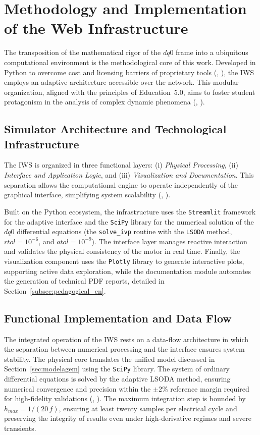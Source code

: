 \documentclass[a4paper]{ifacconf}
\begin{document}
\section{Methodology and Implementation of the Web Infrastructure}

The transposition of the mathematical rigor of the $dq0$ frame into a ubiquitous computational environment is the methodological core of this work. Developed in Python to overcome cost and licensing barriers of proprietary tools (\citeauthor{leedy2013simulink}, \citeyear{leedy2013simulink}), the IWS employs an adaptive architecture accessible over the network. This modular organization, aligned with the principles of Education~5.0, aims to foster student protagonism in the analysis of complex dynamic phenomena (\citeauthor{cordeiro2024educacao}, \citeyear{cordeiro2024educacao}).

\subsection{Simulator Architecture and Technological Infrastructure}

The IWS is organized in three functional layers: (i) \textit{Physical Processing}, (ii) \textit{Interface and Application Logic}, and (iii) \textit{Visualization and Documentation}. This separation allows the computational engine to operate independently of the graphical interface, simplifying system scalability (\citeauthor{aktaibi2011dynamic}, \citeyear{aktaibi2011dynamic}).

Built on the Python ecosystem, the infrastructure uses the \texttt{Streamlit} framework for the adaptive interface and the \texttt{SciPy} library for the numerical solution of the $dq0$ differential equations (the \texttt{solve\_ivp} routine with the \texttt{LSODA} method, $rtol = 10^{-6}$, and $atol = 10^{-9}$). The interface layer manages reactive interaction and validates the physical consistency of the motor in real time. Finally, the visualization component uses the \texttt{Plotly} library to generate interactive plots, supporting active data exploration, while the documentation module automates the generation of technical PDF reports, detailed in Section~\ref{subsec:pedagogical_en}.

\subsection{Functional Implementation and Data Flow}

The integrated operation of the IWS rests on a data-flow architecture in which the separation between numerical processing and the interface ensures system stability. The physical core translates the unified model discussed in Section~\ref{sec:modelagem} using the \texttt{SciPy} library. The system of ordinary differential equations is solved by the adaptive LSODA method, ensuring numerical convergence and precision within the $\pm 2\%$ reference margin required for high-fidelity validations (\citeauthor{li2010simulation}, \citeyear{li2010simulation}). The maximum integration step is bounded by $h_{max} = 1/(20\,f)$, ensuring at least twenty samples per electrical cycle and preserving the integrity of results even under high-derivative regimes and severe transients.
\end{document}
